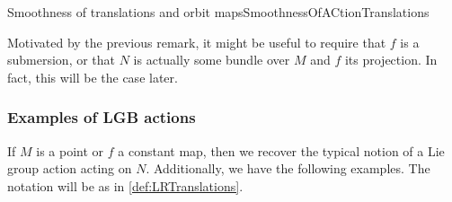 \documentclass[reqno,a4paper,oneside]{amsart}
\theoremstyle{plain}
\theoremstyle{remark}
\theoremstyle{definition}
\def\bas#1\eas{\begin{align*}#1\end{align*}}
\begin{document}
\begin{remarks}{Smoothness of translations and orbit maps}{SmoothnessOfACtionTranslations}
%
%
\end{remarks}

Motivated by the previous remark, it might be useful to require that $f$ is a submersion, or that $N$ is actually some bundle over $M$ and $f$ its projection. In fact, this will be the case later.

%
%

\subsubsection{Examples of LGB actions}

If $M$ is a point or $f$ a constant map, then we recover the typical notion of a Lie group action acting on $N$.
Additionally, we have the following examples. The notation will be as in \ref{def:LRTranslations}.
\end{document}

